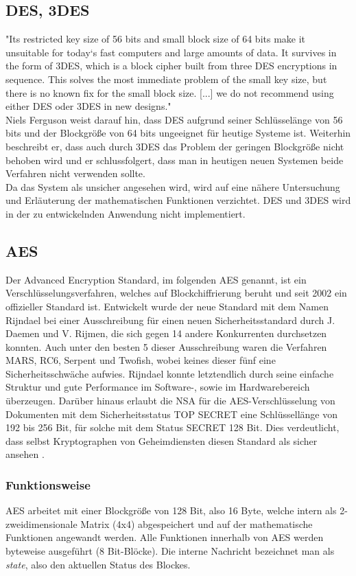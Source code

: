 \documentclass[10pt, a4paper,headsepline,pointednumbers]{scrreprt}
\begin{document}
\subsection{DES, 3DES}
"Its restricted key size of 56 bits and small block size of 64 bits make it unsuitable for today`s fast computers and large amounts of data. It survives in the form of 3DES, which is a block cipher built from three DES encryptions in sequence. This solves the most immediate problem of the small key size, but there is no known fix for the small block size. [...] we do not recommend using either DES oder 3DES in new designs." \citep[S. 51]{book:practical-crypto} \\
Niels Ferguson weist darauf hin, dass DES aufgrund seiner Schlüsselänge von 56 bits und der Blockgröße von 64 bits ungeeignet für heutige Systeme ist. Weiterhin beschreibt er, dass auch durch 3DES das Problem der geringen Blockgröße nicht behoben wird und er schlussfolgert, dass man in heutigen neuen Systemen beide Verfahren nicht verwenden sollte. \\
Da das System als unsicher angesehen wird, wird auf eine nähere Untersuchung und Erläuterung der mathematischen Funktionen verzichtet. DES und 3DES wird in der zu entwickelnden Anwendung nicht implementiert.

\subsection{AES}
Der Advanced Encryption Standard, im folgenden AES genannt, ist ein Verschlüsselungsverfahren, welches auf Blockchiffrierung beruht und seit 2002 ein offizieller Standard ist. Entwickelt wurde der neue Standard mit dem Namen Rijndael bei einer Ausschreibung für einen neuen Sicherheitsstandard durch J. Daemen und V. Rijmen, die sich gegen 14 andere Konkurrenten durchsetzen konnten. Auch unter den besten 5 dieser Ausschreibung waren die Verfahren MARS, RC6, Serpent und Twofish, wobei keines dieser fünf eine Sicherheitsschwäche aufwies. Rijndael konnte letztendlich durch seine einfache Struktur und gute Performance im Software-, sowie im Hardwarebereich überzeugen. \citep[S. 343f]{book:it-sicherheit}
Darüber hinaus erlaubt die NSA für die AES-Verschlüsselung von Dokumenten mit dem Sicherheitsstatus TOP SECRET eine Schlüssellänge von 192 bis 256 Bit, für solche mit dem Status SECRET 128 Bit. Dies verdeutlicht, dass selbst Kryptographen von Geheimdiensten diesen Standard als sicher ansehen \citep[S. 89]{book:understanding-crypto}.


\subsubsection{Funktionsweise}
AES arbeitet mit einer Blockgröße von 128 Bit, also 16 Byte, welche intern als 2-zweidimensionale Matrix (4x4) abgespeichert und auf der mathematische Funktionen angewandt werden.
Alle Funktionen innerhalb von AES werden byteweise ausgeführt (8 Bit-Blöcke).  Die interne Nachricht bezeichnet man als \textit{state}, also den aktuellen Status des Blockes. \\
\end{document}
